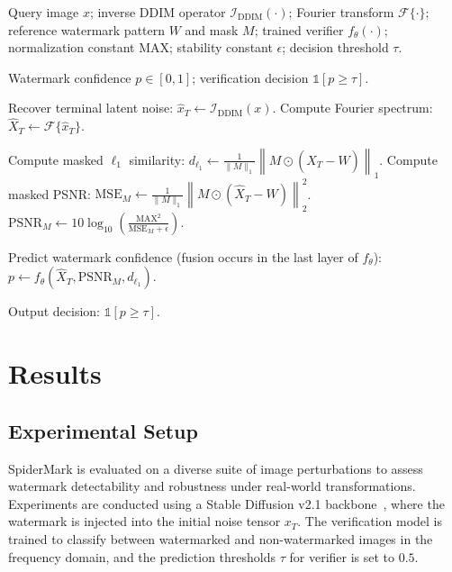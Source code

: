 \documentclass[lettersize,journal,review]{IEEEtran}
\begin{document}
\begin{algorithm}[t]
\caption{Watermark Verification (Inference)}
\label{alg:verification_inference}
\begin{algorithmic}[1]
\Require
Query image $x$;
inverse DDIM operator $\mathcal{I}_{\text{DDIM}}(\cdot)$;
Fourier transform $\mathcal{F}\{\cdot\}$;
reference watermark pattern $W$ and mask $M$;
trained verifier $f_\theta(\cdot)$;
normalization constant $\mathrm{MAX}$;
stability constant $\epsilon$;
decision threshold $\tau$.

\Ensure
Watermark confidence $p \in [0,1]$;
verification decision $\mathbb{1}[p \ge \tau]$.

\State Recover terminal latent noise: $\hat{x}_T \leftarrow \mathcal{I}_{\text{DDIM}}(x)$.
\State Compute Fourier spectrum: $\hat{X}_T \leftarrow \mathcal{F}\{\hat{x}_T\}$.

\State Compute masked $\ell_1$ similarity:
\State \hspace{1.2em} $d_{\ell_1} \leftarrow \frac{1}{\|M\|_1}\left\| M \odot (\hat{X}_T - W) \right\|_1$.
\State Compute masked PSNR:
\State \hspace{1.2em} $\mathrm{MSE}_M \leftarrow \frac{1}{\|M\|_1}\left\| M \odot (\hat{X}_T - W) \right\|_2^2$.
\State \hspace{1.2em} $\mathrm{PSNR}_M \leftarrow 10 \log_{10}\!\left(\frac{\mathrm{MAX}^2}{\mathrm{MSE}_M + \epsilon}\right)$.

\State Predict watermark confidence (fusion occurs in the last layer of $f_\theta$):
\State \hspace{1.2em} $p \leftarrow f_\theta(\hat{X}_T, \mathrm{PSNR}_M, d_{\ell_1})$.

\State {}
\State Output decision: $\mathbb{1}[p \ge \tau]$.
\end{algorithmic}
\end{algorithm}


\section{Results}

\subsection{Experimental Setup}
SpiderMark is evaluated on a diverse suite of image perturbations to assess watermark detectability and robustness under real-world transformations. 
Experiments are conducted using a Stable Diffusion v2.1 backbone~\cite{rombach2022stable}, where the watermark is injected into the initial noise tensor \(x_T\). 
The verification model is trained to classify between watermarked and non-watermarked images in the frequency domain, and the prediction thresholds $\tau$ for verifier is set to $0.5$.
\end{document}
